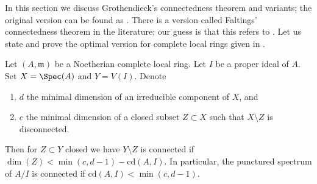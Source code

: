 \noindent
In this section we discuss Grothendieck's connectedness theorem
and variants; the original version can be found as
\cite[Exposee XIII, Theorem 2.1]{SGA2}. There is a version
called Faltings' connectedness theorem in the literature;
our guess is that this refers to \cite[Theorem 6]{Faltings-some}.
Let us state and prove the optimal version for complete
local rings given in \cite[Theorem 1.6]{Varbaro}.

\begin{lemma}
\label{lemma-punctured-still-connected}
\begin{reference}
\cite[Theorem 1.6]{Varbaro}
\end{reference}
Let $(A, \mathfrak m)$ be a Noetherian complete local ring.
Let $I$ be a proper ideal of $A$.
Set $X = \Spec(A)$ and $Y = V(I)$.
Denote
\begin{enumerate}
\item $d$ the minimal dimension of an irreducible component of $X$, and
\item $c$ the minimal dimension of a closed subset $Z \subset X$
such that $X \setminus Z$ is disconnected.
\end{enumerate}
Then for $Z \subset Y$ closed we have $Y \setminus Z$ is connected if
$\dim(Z) < \min(c, d - 1) - \text{cd}(A, I)$. In particular, the punctured
spectrum of $A/I$ is connected if $\text{cd}(A, I) < \min(c, d - 1)$.
\end{lemma}

